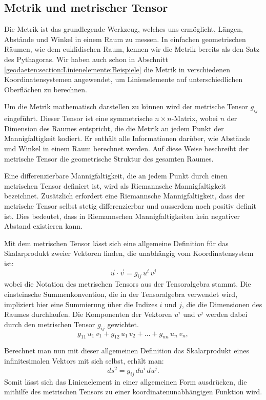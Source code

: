 \subsection{Metrik und metrischer Tensor}

Die Metrik ist das grundlegende Werkzeug, welches uns ermöglicht, Längen, Abstände und Winkel in einem Raum zu messen.
In einfachen geometrischen Räumen, wie dem euklidischen Raum, kennen wir die Metrik bereits als den Satz des Pythagoras.
Wir haben auch schon in Abschnitt \ref{geodaeten:section:Linienelemente:Beispiele} die Metrik in verschiedenen Koordinatensystemen angewendet, um Linienelemente auf unterschiedlichen Oberflächen zu berechnen.

Um die Metrik mathematisch darstellen zu können wird der metrische Tensor $g_{ij}$ eingeführt.
Dieser Tensor ist eine symmetrische $n \times n$-Matrix, wobei $n$ der Dimension des Raumes entspricht, die die Metrik an jedem Punkt der Mannigfaltigkeit kodiert.
Er enthält alle Informationen darüber, wie Abstände und Winkel in einem Raum berechnet werden.
Auf diese Weise beschreibt der metrische Tensor die geometrische Struktur des gesamten Raumes.

Eine differenzierbare Mannigfaltigkeit, die an jedem Punkt durch einen metrischen Tensor definiert ist, wird als Riemannsche Mannigfaltigkeit bezeichnet. Zusätzlich erfordert eine Riemannsche Mannigfaltigkeit, dass der metrische Tensor selbst stetig differenzierbar und ausserdem noch positiv definit ist. 
Dies bedeutet, dass in Riemannschen Mannigfaltigkeiten kein negativer Abstand existieren kann.

Mit dem metrischen Tensor lässt sich eine allgemeine Definition für das Skalarprodukt zweier Vektoren finden, die unabhängig vom Koordinatensystem ist:
\begin{equation}
	\vec{u} \cdot \vec{v} = g_{ij} \, u^i \, v^j 
\end{equation}
wobei die Notation des metrischen Tensors aus der Tensoralgebra stammt.
Die einsteinsche Summenkonvention, die in der Tensoralgebra verwendet wird, impliziert hier eine Summierung über die Indizes $i$ und $j$, die die Dimensionen des Raumes durchlaufen.
Die Komponenten der Vektoren $u^i$ und $v^j$ werden dabei durch den metrischen Tensor $g_{ij}$ gewichtet.
\begin{equation}
	g_{11} \, u_1 \, v_1 + g_{12} \, u_1 \, v_2 + \dots + g_{nn} \, u_n \, v_n,
\end{equation}

Berechnet man nun mit dieser allgemeinen Definition das Skalarprodukt eines infinitesimalen Vektors mit sich selbst, erhält man:
\begin{equation}
	ds^2 = g_{ij} \, du^i \, du^j.
	\label{geodaeten:equation:MetrischerTensor:AllgemeinesLinienelement}
\end{equation}
Somit lässt sich das Linienelement in einer allgemeinen Form ausdrücken, die mithilfe des metrischen Tensors zu einer koordinatenunabhängigen Funktion wird.

